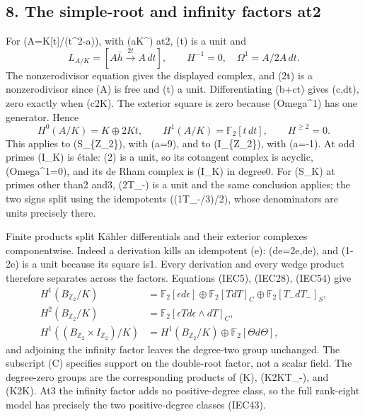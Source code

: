 \documentclass[
  10pt,
]{article}
\begin{document}
\subsection{8. The simple-root and infinity factors
at2}\label{the-simple-root-and-infinity-factors-at2}

For (A=K{[}t{]}/(t\^{}2-a)), with (a\in K\^{}\times) at2, (t) is a unit
and \[
L_{A/K}=[A\bar h\xrightarrow{2t}A\,dt],\qquad
H^{-1}=0,\quad\Omega^1=A/2A\,dt.
\tag{IEC53}
\] The nonzerodivisor equation gives the displayed complex, and (2t) is
a nonzerodivisor since (A) is free and (t) a unit. Differentiating
(b+ct) gives (c,dt), zero exactly when (c\in2K). The exterior square is
zero because (Omega\^{}1) has one generator. Hence \[
H^0(A/K)=K\oplus2Kt,\qquad
H^1(A/K)=\mathbb F_2[t\,dt],\qquad H^{\ge2}=0.
\tag{IEC54}
\] This applies to (S\_\{\mathbb Z\_2\}), with (a=9), and to
(I\_\{\mathbb Z\_2\}), with (a=-1). At odd primes (I\_K) is étale:
(2\Theta) is a unit, so its cotangent complex is acyclic,
(Omega\^{}1=0), and its de Rham complex is (I\_K) in degree0. For (S\_K)
at primes other than2 and3, (2T\_-) is a unit and the same conclusion
applies; the two signs split using the idempotents ((1\pm T\_-/3)/2),
whose denominators are units precisely there.

Finite products split Kähler differentials and their exterior complexes
componentwise. Indeed a derivation kills an idempotent (e): (de=2e,de),
and (1-2e) is a unit because its square is1. Every derivation and every
wedge product therefore separates across the factors. Equations (IEC5),
(IEC28), (IEC54) give \[
\begin{aligned}
H^1(B_{\mathbb Z_2}/K)&=\mathbb F_2[\epsilon d\epsilon]
\oplus\mathbb F_2[TdT]_C\oplus\mathbb F_2[T_-dT_-]_S,\\
H^2(B_{\mathbb Z_2}/K)&=\mathbb F_2[\epsilon T d\epsilon\wedge dT]_C,\\
H^1((B_{\mathbb Z_2}\times I_{\mathbb Z_2})/K)
&=H^1(B_{\mathbb Z_2}/K)\oplus\mathbb F_2[\Theta d\Theta],
\end{aligned}
\tag{IEC55}
\] and adjoining the infinity factor leaves the degree-two group
unchanged. The subscript (C) specifies support on the double-root
factor, not a scalar field. The degree-zero groups are the corresponding
products of (K), (K\oplus2KT\_-), and (K\oplus2K\Theta). At3 the
infinity factor adds no positive-degree class, so the full rank-eight
model has precisely the two positive-degree classes (IEC43).
\end{document}
